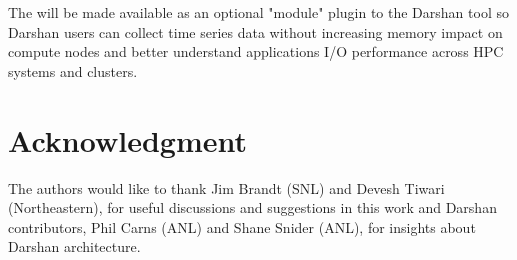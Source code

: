 The \Darshan{} will be made available as an optional "module" plugin to the Darshan tool so 
Darshan users can collect time series data without increasing memory impact on compute nodes 
and better understand applications I/O performance across HPC systems and clusters. 

\section{Acknowledgment}
The authors would like to thank Jim Brandt (SNL) and Devesh Tiwari (Northeastern), for useful discussions and suggestions in this work and Darshan contributors, Phil Carns (ANL) and Shane Snider (ANL), for insights about Darshan architecture.

